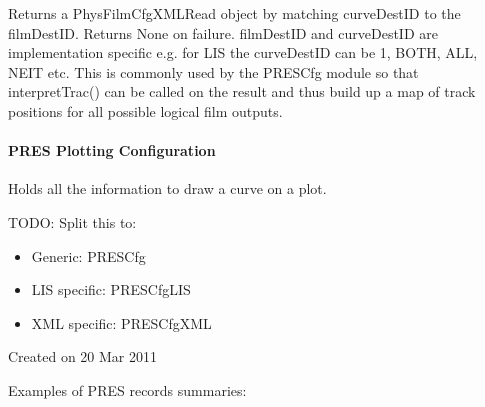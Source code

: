 \documentclass[letterpaper,10pt,english]{sphinxmanual}
\begin{document}
\begin{fulllineitems}
\begin{fulllineitems}
\end{fulllineitems}


\begin{fulllineitems}
\label{\detokenize{ref/util/plot/FILMCfgXML:TotalDepth.util.plot.FILMCfgXML.FilmCfgXMLRead.retFILMDest}}
Returns a PhysFilmCfgXMLRead object by matching curveDestID to the filmDestID.
Returns None on failure. filmDestID and curveDestID are implementation
specific e.g. for LIS the curveDestID can be 1, BOTH, ALL, NEIT etc.
This is commonly used by the PRESCfg module so that interpretTrac() can
be called on the result and thus build up a map of track positions for
all possible logical film outputs.

\end{fulllineitems}


\end{fulllineitems}



\paragraph{PRES Plotting Configuration}
\label{\detokenize{ref/util/plot/PRESCfg:pres-plotting-configuration}}\label{\detokenize{ref/util/plot/PRESCfg::doc}}\label{\detokenize{ref/util/plot/PRESCfg:module-TotalDepth.util.plot.PRESCfg}}
Holds all the information to draw a curve on a plot.

TODO: Split this to:
\begin{itemize}
\item {} 
Generic: PRESCfg

\item {} 
LIS specific: PRESCfgLIS

\item {} 
XML specific: PRESCfgXML

\end{itemize}

Created on 20 Mar 2011

Examples of PRES records summaries:
\end{document}
